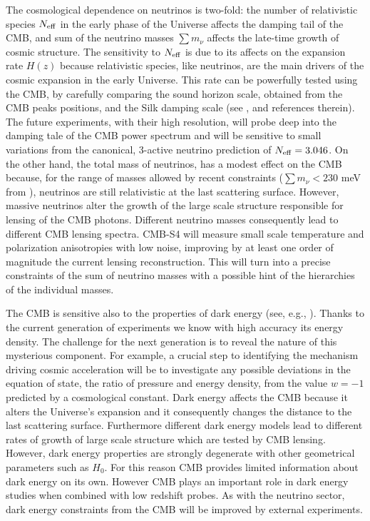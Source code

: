 \documentclass[aps,prd,reprint,superscriptaddress,nofootinbib]{revtex4-1}
\begin{document}
The cosmological dependence on neutrinos is two-fold: the number of relativistic species $N_{\rm eff}$ in the early phase of the Universe affects the damping tail of the CMB, and sum of the neutrino masses $\sum m_\nu$ affects the late-time growth of cosmic structure.
The sensitivity to $N_{\rm eff}$ is due to its affects on the expansion rate $H(z)$ because relativistic species, like neutrinos, are the main drivers of the cosmic expansion in the early Universe. This rate can be powerfully tested using the CMB, by carefully comparing the sound horizon scale, obtained from the CMB peaks positions, and the Silk damping scale (see \cite{2013arXiv1309.5383A}, \cite{2013PhRvD..87h3008H} and references therein). 
The future experiments, with their high resolution, will probe deep into the damping tale of the CMB power spectrum and will be sensitive to small variations from the canonical, 3-active neutrino prediction of $N_{\rm eff}=3.046$. On the other hand, the total mass of neutrinos, has a modest effect on the CMB because, for the range of masses allowed by recent constraints ($\sum m_{\nu}<230$ meV from \cite{planck-collaboration:2014}), neutrinos are still relativistic at the last scattering surface. However, massive neutrinos alter the growth of the large scale structure responsible for lensing of the CMB photons. Different neutrino masses consequently lead to different CMB lensing spectra. CMB-S4 will measure small scale temperature and polarization anisotropies with low noise,  improving by at least one order of magnitude the current lensing reconstruction. This will turn into a precise constraints of the sum of neutrino masses with a possible hint of the hierarchies of the individual masses.

The CMB is sensitive also to the properties of dark energy (see, e.g., \cite{2010MNRAS.405.2639J}). Thanks to the current generation of experiments we know with high accuracy its energy density. The challenge for the next generation is to reveal the nature of this mysterious component. For example, a crucial step to identifying the mechanism driving cosmic acceleration will be to investigate any possible deviations in the equation of state, the ratio of pressure and energy density, from the value $w=-1$ predicted by a cosmological constant. 
Dark energy affects the CMB because it alters the Universe's expansion and it consequently changes the distance to the last scattering surface. Furthermore different dark energy models lead to different rates of growth of large scale structure which are tested by CMB lensing. 
However, dark energy properties are strongly degenerate with other geometrical parameters such as $H_{0}$. For this reason CMB provides limited information about dark energy on its own. However CMB plays an important role in dark energy studies when combined with low redshift probes. As with the neutrino sector, dark energy constraints from the CMB 
will be improved by external experiments.
\end{document}
